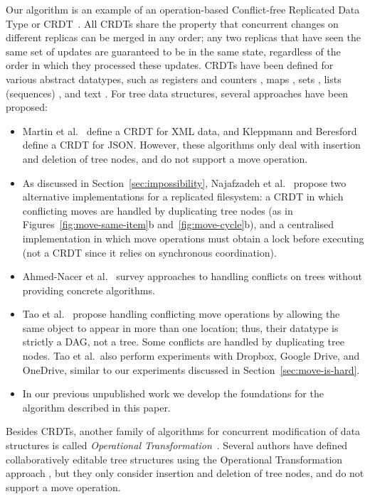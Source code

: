 \documentclass[sigconf]{acmart}
\begin{document}
Our algorithm is an example of an operation-based Conflict-free Replicated Data Type or CRDT~\cite{Shapiro:2011wy,Shapiro:2011un,Burckhardt:2014ft}.
All CRDTs share the property that concurrent changes on different replicas can be merged in any order; any two replicas that have seen the same set of updates are guaranteed to be in the same state, regardless of the order in which they processed these updates.
CRDTs have been defined for various abstract datatypes, such as registers and counters \cite{Shapiro:2011wy,Shapiro:2011un}, maps \cite{Baquero:2016iv,Kleppmann:2016ve}, sets \cite{Bieniusa:2012wu,Bieniusa:2012gt}, lists (sequences) \cite{Roh:2011dw,Nedelec:2013ky}, and text \cite{Preguica:2009fz,Weiss:2010hx}.
For tree data structures, several approaches have been proposed:
\begin{itemize}
    \item Martin et al.~\cite{Martin:2010ih} define a CRDT for XML data, and Kleppmann and Beresford~\cite{Kleppmann:2016ve} define a CRDT for JSON.
        However, these algorithms only deal with insertion and deletion of tree nodes, and do not support a move operation.
    \item As discussed in Section~\ref{sec:impossibility}, Najafzadeh et al.~\cite{Najafzadeh:2017vk,Najafzadeh:2018bw} propose two alternative implementations for a replicated filesystem: a CRDT in which conflicting moves are handled by duplicating tree nodes (as in Figures~\ref{fig:move-same-item}b and~\ref{fig:move-cycle}b), and a centralised implementation in which move operations must obtain a lock before executing (not a CRDT since it relies on synchronous coordination).
    \item Ahmed-Nacer et al.~\cite{AhmedNacer:2012us} survey approaches to handling conflicts on trees without providing concrete algorithms.
    \item Tao et al.~\cite{Tao:2015gd} propose handling conflicting move operations by allowing the same object to appear in more than one location; thus, their datatype is strictly a DAG, not a tree.
        Some conflicts are handled by duplicating tree nodes.
        Tao et al.\ also perform experiments with Dropbox, Google Drive, and OneDrive, similar to our experiments discussed in Section~\ref{sec:move-is-hard}.
    \item In our previous unpublished work \cite{ExtendedVersion} we develop the foundations for the algorithm described in this paper.
\end{itemize}

Besides CRDTs, another family of algorithms for concurrent modification of data structures is called \emph{Operational Transformation}~\cite{Sun:1998vf}.
Several authors have defined collaboratively editable tree structures using the Operational Transformation approach \cite{Jungnickel:2016cb,Ignat:2003jy,Davis:2002iv}, but they only consider insertion and deletion of tree nodes, and do not support a move operation.
\end{document}

